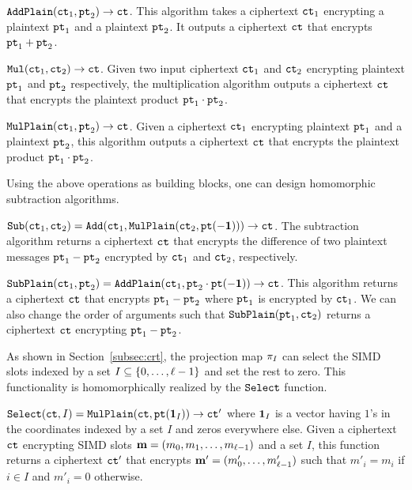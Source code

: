 ${\mathtt{AddPlain}}({\mathtt{ct}}_1, {\mathtt{pt}}_2) \rightarrow {\mathtt{ct}}$. This algorithm takes a ciphertext ${\mathtt{ct}}_1$ encrypting a plaintext ${\mathtt{pt}}_1$ and a plaintext ${\mathtt{pt}}_2$.
It outputs a ciphertext ${\mathtt{ct}}$ that encrypts ${\mathtt{pt}}_1 + {\mathtt{pt}}_2$.

${\mathtt{Mul}}({\mathtt{ct}}_1, {\mathtt{ct}}_2) \rightarrow {\mathtt{ct}}$. Given two input ciphertext ${\mathtt{ct}}_1$ and ${\mathtt{ct}}_2$ encrypting plaintext ${\mathtt{pt}}_1$ and ${\mathtt{pt}}_2$ respectively, the multiplication algorithm outputs a ciphertext ${\mathtt{ct}}$ that encrypts the plaintext product ${\mathtt{pt}}_1 \cdot {\mathtt{pt}}_2$.

${\mathtt{MulPlain}}({\mathtt{ct}}_1, {\mathtt{pt}}_2) \rightarrow {\mathtt{ct}}$. Given a ciphertext ${\mathtt{ct}}_1$ encrypting plaintext ${\mathtt{pt}}_1$ and a plaintext ${\mathtt{pt}}_2$, this algorithm outputs a ciphertext ${\mathtt{ct}}$ that encrypts the plaintext product ${\mathtt{pt}}_1 \cdot {\mathtt{pt}}_2$.

Using the above operations as building blocks, one can design homomorphic subtraction algorithms.

${\mathtt{Sub}}({\mathtt{ct}}_1, {\mathtt{ct}}_2) = {\mathtt{Add}}({\mathtt{ct}}_1, {\mathtt{MulPlain}}({\mathtt{ct}}_2, {\mathtt{pt}}(-\mathbf{1}))) \rightarrow {\mathtt{ct}}$. The subtraction algorithm returns a ciphertext ${\mathtt{ct}}$ that encrypts the difference of two plaintext messages ${\mathtt{pt}}_1 - {\mathtt{pt}}_2$ encrypted by ${\mathtt{ct}}_1$ and ${\mathtt{ct}}_2$, respectively.

${\mathtt{SubPlain}}({\mathtt{ct}}_1, {\mathtt{pt}}_2) = {\mathtt{AddPlain}}({\mathtt{ct}}_1, {\mathtt{pt}}_2 \cdot {\mathtt{pt}}(-\mathbf{1})) \rightarrow {\mathtt{ct}}$. This algorithm returns a ciphertext ${\mathtt{ct}}$ that encrypts ${\mathtt{pt}}_1 - {\mathtt{pt}}_2$ where ${\mathtt{pt}}_1$ is encrypted by ${\mathtt{ct}}_1$.
We can also change the order of arguments such that ${\mathtt{SubPlain}}({\mathtt{pt}}_1, {\mathtt{ct}}_2)$ returns a ciphertext ${\mathtt{ct}}$ encrypting ${\mathtt{pt}}_1 - {\mathtt{pt}}_2$. 

As shown in Section~\ref{subsec:crt}, the projection map $\pi_I$ can select the SIMD slots indexed by a set $I \subseteq \{0,\dots,\ell-1\}$ and set the rest to zero.
This functionality is homomorphically realized by the ${\mathtt{Select}}$ function.

${\mathtt{Select}}({\mathtt{ct}}, I) = {\mathtt{MulPlain}}({\mathtt{ct}}, {\mathtt{pt}}(\mathbf{1}_I)) \rightarrow {\mathtt{ct}}'$ where $\mathbf{1}_I$ is a vector having $1$'s in the coordinates indexed by a set $I$ and zeros everywhere else.
Given a ciphertext ${\mathtt{ct}}$ encrypting SIMD slots $\mathbf{m} = (m_0,m_1,\dots,m_{\ell-1})$ and a set $I$, this function returns a ciphertext ${\mathtt{ct}}'$ that encrypts $\mathbf{m}' = (m'_0,\dots,m'_{\ell-1})$ such that $m'_i = m_i$ if $i \in I$ and $m'_i = 0$ otherwise.

